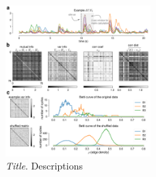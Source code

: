 \begin{figure}[H]
    \centering
    \includegraphics[width=0.5\textwidth,center]{../figures/report/Fig1.png}
    \caption{\label{fig:1}
    \textit{Title}.
    Descriptions
    }
\end{figure}